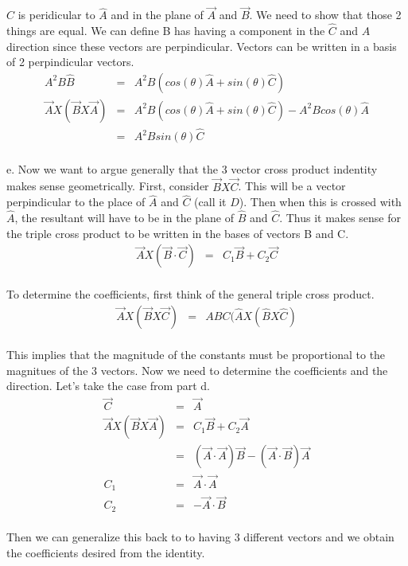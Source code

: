 \documentclass[11pt]{amsart}
\begin{document}
$\hat{C}$ is peridicular to $\hat{A}$ and in the plane of $\vec{A}$ and $\vec{B}$. We need to show that those 2 things are equal. We can define B has having a component in the $\hat{C}$ and $\hat{A}$ direction since these vectors are perpindicular. Vectors can be written in a basis of 2 perpindicular vectors. \\
\begin{eqnarray*}
A^{2}B\hat{B} &=& A^{2}B(cos(\theta)\hat{A}+sin(\theta)\hat{C}) \\
\vec{A}X(\vec{B}X\vec{A}) &=& A^{2}B(cos(\theta)\hat{A}+sin(\theta)\hat{C})-A^{2}Bcos(\theta)\hat{A} \\
&=& A^{2}Bsin(\theta)\hat{C} 
\end{eqnarray*} \\
e. Now we want to argue generally that the 3 vector cross product indentity makes sense geometrically. First, consider $\vec{B}X\vec{C}$. This will be a vector perpindicular to  the place of $\hat{A}$ and $\hat{C}$ (call it $\hat{D}$). Then when this is crossed with $\hat{A}$, the resultant will have to be in the plane of $\hat{B}$ and $\hat{C}$. Thus it makes sense for the triple cross product to be written in the bases of vectors B and C. \\
\begin{eqnarray*}
\vec{A}X(\vec{B}\cdot{\vec{C}}) &=& C_{1}\vec{B}+C_{2}\vec{C} 
\end{eqnarray*} \\
To determine the coefficients, first think of the general triple cross product. \\
\begin{eqnarray*}
\vec{A}X(\vec{B}X\vec{C}) &=& ABC(\hat{A}X(\hat{B}X\hat{C}) 
\end{eqnarray*} \\
This implies that the magnitude of the constants must be proportional to the magnitues of the 3 vectors. Now we need to determine the coefficients and the direction. Let's take the case from part d. \\
\begin{eqnarray*}
\vec{C} &=& \vec{A} \\
\vec{A}X(\vec{B}X\vec{A}) &=& C_{1}\vec{B}+C_{2}\vec{A} \\
&=& (\vec{A}\cdot{\vec{A}})\vec{B}-(\vec{A}\cdot{\vec{B}})\vec{A} \\
C_{1} &=& \vec{A}\cdot{\vec{A}} \\
C_{2} &=& -\vec{A}\cdot{\vec{B}} 
\end{eqnarray*} \\
Then we can generalize this back to to having 3 different vectors and we obtain the coefficients desired from the identity. \\
\end{document}
